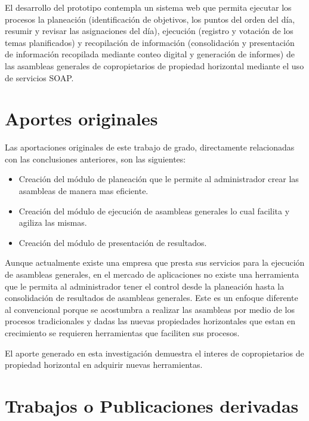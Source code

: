 \vspace{0.5cm}

El desarrollo del prototipo contempla un sistema web que permita ejecutar los procesos la planeación (identificación de objetivos, los puntos del orden del día, resumir y revisar las asignaciones del día), ejecución (registro y votación de los temas planificados) y recopilación de información (consolidación y presentación de información recopilada mediante conteo digital y generación de informes) de las asambleas generales de copropietarios de propiedad horizontal mediante el uso de servicios SOAP. 


\section{Aportes originales}

Las aportaciones originales de este trabajo de grado, directamente relacionadas con las conclusiones anteriores, son las siguientes: 

\begin{itemize}
	\item Creación del módulo de planeación que le permite al administrador crear las asambleas de manera mas eficiente.
	\item Creación del módulo de ejecución de asambleas generales lo cual facilita y agiliza las mismas.
	\item Creación del módulo de presentación de resultados.
\end{itemize}

Aunque actualmente existe una empresa que presta sus servicios para la ejecución de asambleas generales, en el mercado de aplicaciones no existe una herramienta que le permita al administrador tener el control desde la planeación hasta la consolidación de resultados de asambleas generales. Este es un enfoque diferente al convencional porque se acostumbra a realizar las asambleas por medio de los procesos tradicionales y dadas las nuevas propiedades horizontales que estan en crecimiento se requieren herramientas que faciliten sus procesos. 

\vspace{0.5cm}

El aporte generado en esta investigación demuestra el interes de copropietarios de propiedad horizontal en adquirir nuevas herramientas.

\section{Trabajos o Publicaciones derivadas}

